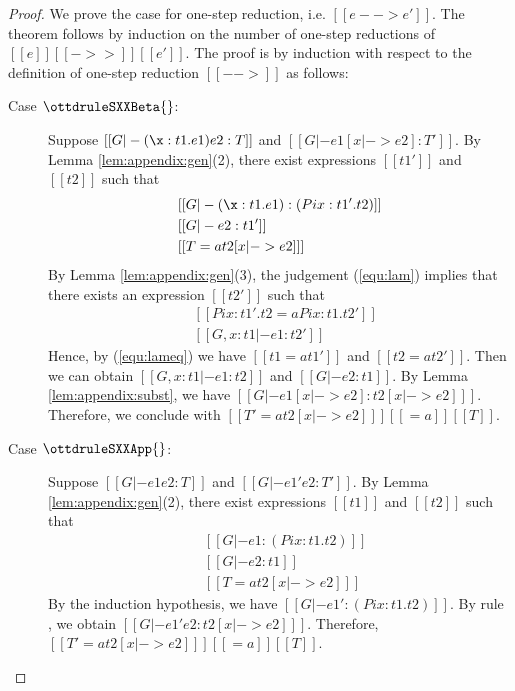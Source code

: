 \begin{proof}
    We prove the case for one-step reduction, i.e. $[[e --> e']]$. The theorem
follows by induction on the number of one-step reductions of $[[e]] [[->>]]
[[e']]$.
    The proof is by induction with respect to the definition of one-step
reduction $[[-->]]$ as follows:
    \begin{description}
        \item[Case $\ottdruleSXXBeta{}$:] $\quad$ \\
        Suppose $[[G |- (\x:t1.e1)e2 :T]]$ and $[[G |- e1 [x |-> e2] :T']]$. By
Lemma \ref{lem:appendix:gen}(2), there exist expressions $[[t1']]$ and $[[t2]]$
such that 
        \begin{align}
            &[[G |- (\x:t1.e1):(Pi x:t1'.t2)]] \label{equ:lam} \\
            &[[G |- e2:t1']] \nonumber \\
            &[[T =a t2 [x |-> e2] ]] \nonumber
        \end{align}
        By Lemma \ref{lem:appendix:gen}(3), the judgement (\ref{equ:lam})
implies that there exists an expression $[[t2']]$ such that
        \begin{align}
            &[[Pi x:t1'.t2 =a Pi x:t1.t2']] \label{equ:lameq}\\
            &[[G, x:t1 |- e1:t2']] \nonumber
        \end{align}
        Hence, by (\ref{equ:lameq}) we have $[[t1 =a t1']]$ and $[[t2 =a
t2']]$. Then we can obtain $[[G, x:t1 |- e1:t2]]$ and $[[G |- e2:t1]]$. By
Lemma \ref{lem:appendix:subst}, we have $[[G |- e1[x |-> e2] : t2[x |-> e2]
]]$. Therefore, we conclude with $[[T' =a t2[x |-> e2] ]] [[=a]] [[T]]$.
        
        \item[Case $\ottdruleSXXApp{}$:] $\quad$ \\
        Suppose $[[G |- e1 e2 :T]]$ and $[[G |- e1' e2 :T']]$. By Lemma
\ref{lem:appendix:gen}(2), there exist expressions $[[t1]]$ and $[[t2]]$ such
that 
        \begin{align*}
            &[[G |- e1:(Pi x:t1.t2)]] \\
            &[[G |- e2:t1]]\\
            &[[T =a t2 [x |-> e2] ]]
        \end{align*}
        By the induction hypothesis, we have $[[G |- e1':(Pi x:t1.t2)]]$. By rule
, we obtain $[[G |- e1' e2 : t2[x |-> e2] ]]$. Therefore, $[[T'
=a t2[x |-> e2] ]] [[=a]] [[T]]$.
        

\end{description}
\end{proof}
